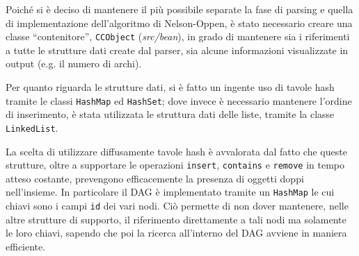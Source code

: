 \documentclass[a4paper,11pt]{article}
\begin{document}
Poiché si è deciso di mantenere il più possibile separate la fase di 
parsing e quella di implementazione dell'algoritmo di Nelson-Oppen, è 
stato necessario creare una classe “contenitore”, \texttt{CCObject} 
(\emph{src/bean}), in grado di mantenere sia i riferimenti a tutte le 
strutture dati create dal parser, sia alcune informazioni visualizzate 
in output (e.g. il numero di archi).\par
Per quanto riguarda le strutture dati, si è fatto un ingente uso di tavole 
hash tramite le classi \texttt{HashMap} ed \texttt{HashSet}; dove invece
è necessario mantenere l'ordine di inserimento, è stata utilizzata le 
struttura dati delle liste, tramite la classe \texttt{LinkedList}.\par
La scelta di utilizzare diffusamente tavole hash è avvalorata dal 
fatto che queste strutture, oltre a supportare le operazioni 
\texttt{insert}, \texttt{contains} e \texttt{remove} in tempo atteso 
costante, prevengono efficacemente la presenza di oggetti doppi nell'insieme.
In particolare il DAG è implementato tramite un \texttt{HashMap} le 
cui chiavi sono i campi \texttt{id} dei vari nodi.
Ciò permette di non dover mantenere, nelle altre strutture di supporto, 
il riferimento direttamente a tali nodi ma solamente le loro chiavi, sapendo 
che poi la ricerca all'interno del DAG avviene in maniera efficiente.
\end{document}
